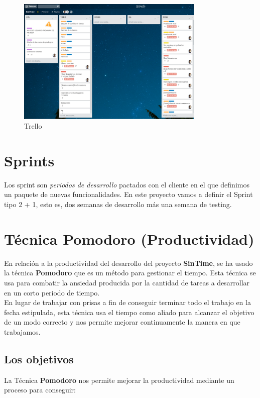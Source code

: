 \begin{figure}[ht]
	\centering
	\includegraphics[width=0.8\textwidth]{imagenes/trello.png}
	\caption{Trello}
	\label{trello}
\end{figure}

\section{Sprints}
Los sprint son \textit{periodos de desarrollo} pactados con el cliente en el que definimos un paquete de nuevas funcionalidades. En este proyecto vamos a definir el Sprint tipo 2 + 1, esto es, dos semanas de desarrollo más una semana de testing.

\section{Técnica Pomodoro (Productividad)}

En relación a la productividad del desarrollo del proyecto \textbf{SinTime}, se ha usado la técnica \textbf{Pomodoro} que es un método para gestionar el tiempo. Esta técnica se usa para combatir la ansiedad producida por la cantidad de tareas a desarrollar en un corto periodo de tiempo.\\

En lugar de trabajar con prisas a fin de conseguir terminar todo el trabajo en la fecha estipulada, esta técnica usa el tiempo como aliado para alcanzar el objetivo de un modo correcto y nos permite mejorar continuamente la manera en que trabajamos.

\subsection{Los objetivos}

La Técnica \textbf{Pomodoro} nos permite mejorar la productividad mediante un proceso para conseguir:\\

